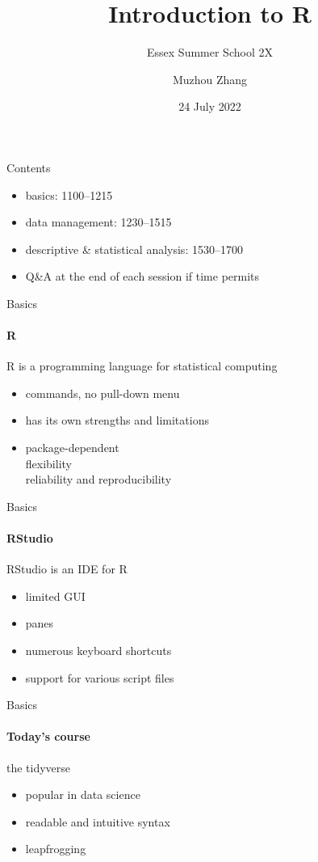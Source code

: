 \documentclass{beamer}
\title{Introduction to R}
\subtitle{Essex Summer School 2X}
\author{Muzhou Zhang}
\date{24 July 2022}
\begin{document}
\maketitle
{}

\begin{frame}{Contents}
\begin{itemize}
    \item basics: 1100--1215
    \item data management: 1230--1515
    \item descriptive \& statistical analysis: 1530--1700
    \item Q\&A at the end of each session if time permits
\end{itemize}
\end{frame}

\begin{frame}{Basics}
\framesubtitle{R}
R is a programming language for statistical computing
\begin{itemize}
    \item commands, no pull-down menu
    \item has its own strengths and limitations
    \item package-dependent\\ flexibility\\ reliability and reproducibility
\end{itemize}
\end{frame}

\begin{frame}{Basics}
\framesubtitle{RStudio}
RStudio is an IDE for R
\begin{itemize}
    \item limited GUI
    \item panes
    \item numerous keyboard shortcuts
    \item support for various script files
\end{itemize}
\end{frame}

\begin{frame}{Basics}
\framesubtitle{Today's course}
the tidyverse
\begin{itemize}
    \item popular in data science
    \item readable and intuitive syntax
    \item leapfrogging
\end{itemize}
\end{frame}    
\end{document}

